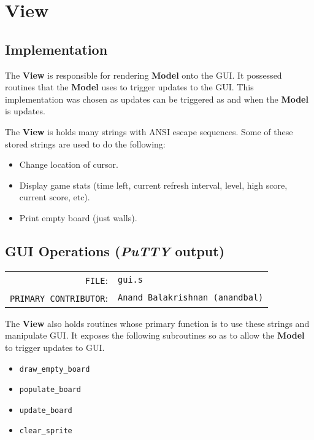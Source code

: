   \section{View}

  \subsection{Implementation}

  The \textbf{View} is responsible for rendering \textbf{Model} onto the GUI. It possessed routines that
  the \textbf{Model} uses to trigger updates to the GUI. This implementation was chosen as updates can
  be triggered as and when the \textbf{Model} is updates.

  The \textbf{View} is holds many strings with ANSI escape sequences. Some of these stored strings are used to do the following:

  \begin{itemize}
    \item Change location of cursor.
    \item Display game stats (time left, current refresh interval, level, high score, current score, etc).
    \item Print empty board (just walls).
  \end{itemize}

 
  \subsection{GUI Operations (\textit{PuTTY} output)}
  \begin{table}[H]
  \begin{tabular}{rl}
    \texttt{FILE}:         &\texttt{gui.s}  \\
    \texttt{PRIMARY CONTRIBUTOR}:    &\texttt{Anand Balakrishnan (anandbal)}
  \end{tabular}
  \end{table}

   The \textbf{View} also holds routines whose primary function is to use these strings and manipulate GUI.
    It exposes the following subroutines so as to allow the \textbf{Model} to trigger updates to GUI.

    \begin{itemize}
      \item \texttt{draw\_empty\_board}
      \item \texttt{populate\_board}
      \item \texttt{update\_board}
      \item \texttt{clear\_sprite}
    \end{itemize}

